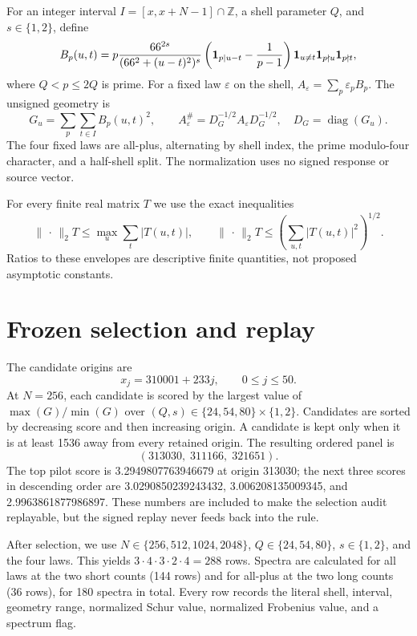 \documentclass[10pt]{article}
\newcommand{\opnorm}{\lVert\,\cdot\,\rVert_2}
\begin{document}
For an integer interval $I=[x,x+N-1]\cap\mathbb Z$, a shell parameter $Q$,
and $s\in\{1,2\}$, define
\begin{equation}
 B_p(u,t)=p\frac{66^{2s}}{(66^2+(u-t)^2)^s}
 \left({\bf1}_{p\mid u-t}-\frac1{p-1}\right)
 {\bf1}_{u\ne t}{\bf1}_{p\nmid u}{\bf1}_{p\nmid t},
 \label{eq:block}
\end{equation}
where $Q<p\leq 2Q$ is prime.  For a fixed law $\varepsilon$ on the shell,
$A_\varepsilon=\sum_p\varepsilon_pB_p$.  The unsigned geometry is
\begin{equation}
 G_u=\sum_{p}\sum_{t\in I}B_p(u,t)^2,
 \qquad A_\varepsilon^\#=D_G^{-1/2}A_\varepsilon D_G^{-1/2},
 \quad D_G=\operatorname{diag}(G_u).
 \label{eq:normalization}
\end{equation}
The four fixed laws are all-plus, alternating by shell index, the prime
modulo-four character, and a half-shell split.  The normalization uses no
signed response or source vector.

For every finite real matrix $T$ we use the exact inequalities
\begin{equation}
 \opnorm{T}\leq \max_u\sum_t|T(u,t)|,
 \qquad
 \opnorm{T}\leq \left(\sum_{u,t}|T(u,t)|^2\right)^{1/2}.
 \label{eq:envelopes}
\end{equation}
Ratios to these envelopes are descriptive finite quantities, not proposed
asymptotic constants.

\section{Frozen selection and replay}

The candidate origins are
\begin{equation*}
 x_j=310001+233j,\qquad 0\leq j\leq 50.
\end{equation*}
At $N=256$, each candidate is scored by the largest value of
$\max(G)/\min(G)$ over $(Q,s)\in\{24,54,80\}\times\{1,2\}$.  Candidates are
sorted by decreasing score and then increasing origin.  A candidate is kept
only when it is at least 1536 away from every retained origin.  The resulting
ordered panel is
\[
 (313030,\;311166,\;321651).
\]
The top pilot score is 3.2949807763946679 at origin 313030; the next three
scores in descending order are 3.0290850239243432, 3.006208135009345, and
2.9963861877986897.  These numbers are included to make the selection audit
replayable, but the signed replay never feeds back into the rule.

After selection, we use $N\in\{256,512,1024,2048\}$, $Q\in\{24,54,80\}$,
$s\in\{1,2\}$, and the four laws.  This yields
$3\cdot4\cdot3\cdot2\cdot4=288$ rows.  Spectra are calculated for all laws
at the two short counts (144 rows) and for all-plus at the two long counts
(36 rows), for 180 spectra in total.  Every row records the literal shell,
interval, geometry range, normalized Schur value, normalized Frobenius value,
and a spectrum flag.
\end{document}
